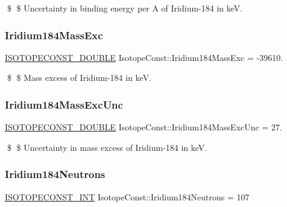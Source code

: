 \$ \$ Uncertainty in binding energy per A of Iridium-\/184 in keV. \mbox{\label{group___isotope_const-_iridium-_ir184_ga863bcfab9860569861d6bf28d3eb40ec}} 
\subsubsection{\texorpdfstring{Iridium184\+Mass\+Exc}{Iridium184MassExc}}
{\footnotesize\ttfamily \mbox{\hyperlink{group___isotope_const-_macros_ga8f45a7272ce02c0b4c65c44636ed719a}{I\+S\+O\+T\+O\+P\+E\+C\+O\+N\+S\+T\+\_\+\+D\+O\+U\+B\+LE}} Isotope\+Const\+::\+Iridium184\+Mass\+Exc = -\/39610.}

\$ \$ Mass excess of Iridium-\/184 in keV. \mbox{\label{group___isotope_const-_iridium-_ir184_ga85b494358858b6ddd2438258ca26380b}} 
\subsubsection{\texorpdfstring{Iridium184\+Mass\+Exc\+Unc}{Iridium184MassExcUnc}}
{\footnotesize\ttfamily \mbox{\hyperlink{group___isotope_const-_macros_ga8f45a7272ce02c0b4c65c44636ed719a}{I\+S\+O\+T\+O\+P\+E\+C\+O\+N\+S\+T\+\_\+\+D\+O\+U\+B\+LE}} Isotope\+Const\+::\+Iridium184\+Mass\+Exc\+Unc = 27.}

\$ \$ Uncertainty in mass excess of Iridium-\/184 in keV. \mbox{\label{group___isotope_const-_iridium-_ir184_ga841a0706faba1d807dfa8d668cfc97f2}} 
\subsubsection{\texorpdfstring{Iridium184\+Neutrons}{Iridium184Neutrons}}
{\footnotesize\ttfamily \mbox{\hyperlink{group___isotope_const-_macros_ga5f18360b3e99483a35c32d789e62621c}{I\+S\+O\+T\+O\+P\+E\+C\+O\+N\+S\+T\+\_\+\+I\+NT}} Isotope\+Const\+::\+Iridium184\+Neutrons = 107}

